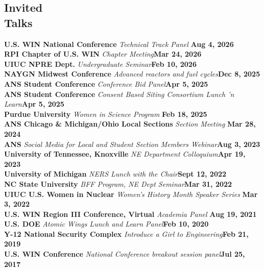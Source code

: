 \documentclass[margin,line]{resume}
\begin{document}
\begin{resume}
    \section{\mysidestyle Invited\\Talks}
    \textbf{U.S. WIN National Conference} \textsl{Technical Track Panel} \hfill \textbf{Aug 4, 2026}\\
    \textbf{RPI Chapter of U.S. WIN} \textsl{Chapter Meeting}\hfill \textbf{Mar 24, 2026}\\
    \textbf{UIUC NPRE Dept.} \textsl{Undergraduate Seminar}\hfill \textbf{Feb 10, 2026}\\
    \textbf{NAYGN Midwest Conference} \textsl{Advanced reactors and fuel cycles}\hfill \textbf{Dec 8, 2025}\\
    \textbf{ANS Student Conference} \textsl{Conference Bid Panel}\hfill \textbf{Apr 5, 2025}\\
    \textbf{ANS Student Conference} \textsl{Consent Based Siting Consortium Lunch 'n Learn}\hfill \textbf{Apr 5, 2025}\\
    \textbf{Purdue University} \textsl{Women in Science Program} \hfill \textbf{Feb 18, 2025}\\ 
    \textbf{ANS Chicago \& Michigan/Ohio Local Sections} \textsl{Section Meeting} \hfill\textbf{Mar 28, 2024}\\
    \textbf{ANS} \textsl{Social Media for Local and Student Section Members Webinar}\hfill \textbf{Aug 3, 2023}\\
    \textbf{University of Tennessee, Knoxville} \textsl{NE Department Colloquium}\hfill \textbf{Apr 19, 2023}\\
    \textbf{University of Michigan} \textsl{NERS Lunch with the Chair}\hfill \textbf{Sept 12, 2022}\\
    \textbf{NC State University} \textsl{BFF Program, NE Dept Seminar}\hfill\textbf{Mar 31, 2022}\\
    \textbf{UIUC U.S. Women in Nuclear} \textsl{Women's History Month Speaker Series} \hfill\textbf{Mar 3, 2022}\\
    \textbf{U.S. WIN Region III Conference, Virtual} \textsl{Academia Panel} \hfill \textbf{Aug 19, 2021}\\
    \textbf{U.S. DOE} \textsl{Atomic Wings Lunch and Learn Panel}\hfill \textbf{Feb 10, 2020} \\
    \textbf{Y-12 National Security Complex} \textsl{Introduce a Girl to Engineering}\hfill \textbf{Feb 21, 2019} \\
    \textbf{U.S. WIN Conference} \textsl{National Conference breakout session panel}\hfill \textbf{Jul 25, 2017}
    

\end{resume}
\end{document}
